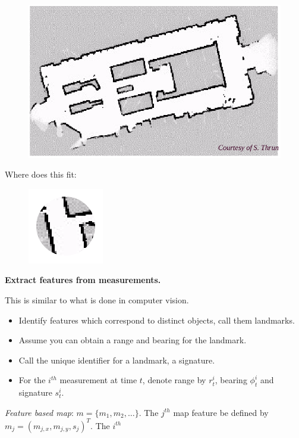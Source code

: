 \begin{figure}
\centering
\includegraphics{LocalizationFigures/map5.png}
\caption{}
\end{figure}

Where does this fit:

\begin{figure}
\centering
\includegraphics{LocalizationFigures/map5_cut.png}
\caption{}
\end{figure}

\textbf{Extract features from measurements.}

This is similar to what is done in computer vision.

\begin{itemize}
\tightlist
\item
  Identify features which correspond to distinct objects, call them
  landmarks.
\item
  Assume you can obtain a range and bearing for the landmark.
\item
  Call the unique identifier for a landmark, a signature.
\item
  For the \(i^{th}\) measurement at time \(t\), denote range by
  \(r^i_t\), bearing \(\phi^i_t\) and signature \(s^i_t\).
\end{itemize}

\emph{Feature based map}: \(m = \{ m_1, m_2, \dots \}\). The \(j^{th}\)
map feature be defined by \(m_j = (m_{j,x}, m_{j,y}, s_j)^T\). The
\(i^{th}\)

